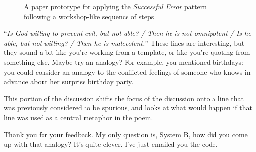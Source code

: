 \begin{figure*}[t]
\begin{center}
\end{center}
\caption{A paper prototype for applying the \emph{Successful Error} pattern following a workshop-like sequence of steps\label{fig:paper-prototype}}
\end{figure*}

\begin{center}
\begin{minipage}{.9\columnwidth}
\begin{dialogue}
 ``\emph{Is God willing to prevent evil, but not able? / Then he is not omnipotent / Is he able, but not willing? / Then he is malevolent.}''
%
 These lines are interesting, but
they sound a bit like you're working from a
template, or like you're quoting from something
else.
%
 Maybe try an analogy?  For example, you mentioned
birthdays: you could consider an analogy to the conflicted feelings of
someone who knows in advance about her surprise birthday party.
\end{dialogue}
\end{minipage}
\end{center}

This portion of the discussion shifts the focus
of the discussion onto a line that was previously
considered to be spurious, and looks at what
would happen if that line was used as a central
metaphor in the poem.

\begin{center}
\begin{minipage}{.9\columnwidth}
\begin{dialogue}
 Thank you for your feedback.  My only question is, System
B, how did you come up with that analogy?  It's quite clever.
%
 I've just emailed you the code.
\end{dialogue}
\end{minipage}
\end{center}

